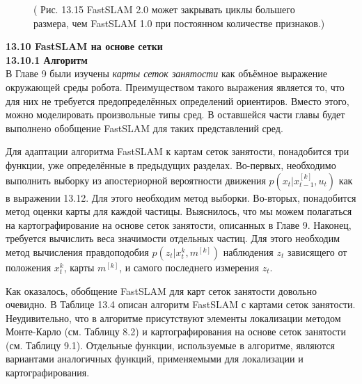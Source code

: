 \documentclass[10pt,a4paper]{article}
\begin{document}
\begin{figure}[H]
	\caption{ ( Рис. 13.15 FastSLAM 2.0 может закрывать циклы большего размера, чем FastSLAM 1.0 при постоянном количестве признаков.) }
	\label{fig:1315orig}
\end{figure}

\textbf{13.10	FastSLAM на основе сетки}\\

\textbf{13.10.1	Алгоритм}\\

В Главе 9 были изучены \textit{карты сеток занятости} как объёмное выражение окружающей среды робота. Преимуществом такого выражения является то, что для них не требуется предопределённых определений ориентиров. Вместо этого, можно моделировать произвольные типы сред. В оставшейся части главы будет выполнено обобщение FastSLAM  для таких представлений сред.

Для адаптации алгоритма FastSLAM к картам сеток занятости, понадобится три функции, уже определённые в предыдущих разделах. Во-первых, необходимо выполнить выборку из апостериорной вероятности движения $p(x_t|x_{t-1}^{[k]}, u_t)$ как в выражении 13.12. Для этого необходим метод выборки. Во-вторых, понадобится метод оценки карты для каждой частицы. Выяснилось, что мы можем полагаться на картографирование на основе сеток занятости, описанных в Главе 9. Наконец, требуется вычислить веса значимости отдельных частиц. Для этого необходим метод вычисления правдоподобия $p(z_t|x_t^k, m^{[k]})$ наблюдения $z_t$ зависящего от положения $x_t^k$, карты $m^{[k]}$, и самого последнего измерения $z_t$.

Как оказалось, обобщение FastSLAM для карт сеток занятости довольно очевидно. В Таблице 13.4 описан алгоритм FastSLAM с картами сеток занятости. Неудивительно, что в алгоритме присутствуют элементы локализации методом Монте-Карло (см. Таблицу 8.2) и картографирования на основе сеток занятости (см. Таблицу 9.1). Отдельные функции, используемые в алгоритме, являются вариантами аналогичных функций, применяемыми для локализации и картографирования.
\end{document}
